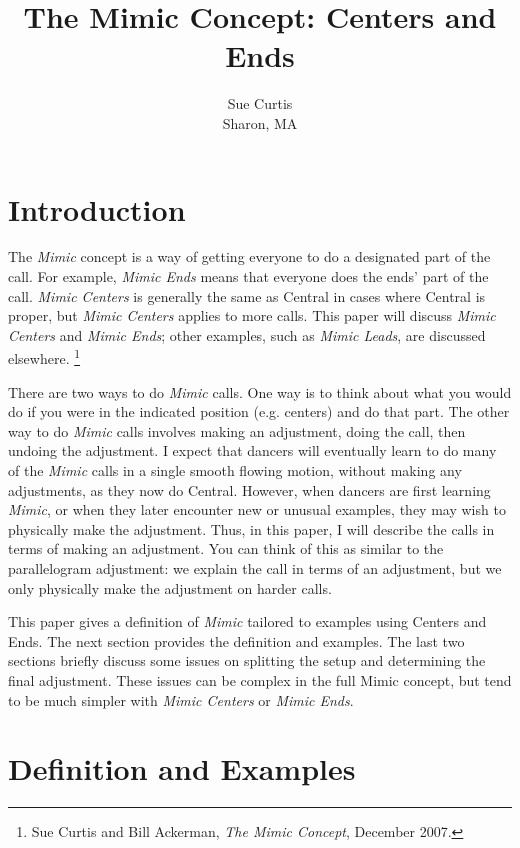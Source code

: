 \documentclass[12pt]{article}
\begin{document}
\title{The Mimic Concept: Centers and Ends}
\author{Sue Curtis \\ Sharon, MA}
\date{}
\maketitle

\parskip 12pt
\section{Introduction}

The \emph{Mimic} concept is a way of getting everyone to do a designated
part of the call.
For example, \emph{Mimic Ends} means that everyone does the ends'
part of the call.
\emph{Mimic Centers} is generally the same as Central in cases where
Central is proper, but \emph{Mimic Centers} applies to more calls.
This paper will discuss \emph{Mimic Centers} and \emph{Mimic Ends};
other examples, such as \emph{Mimic Leads}, are discussed elsewhere.
\footnote{Sue Curtis and Bill Ackerman, \emph{The Mimic Concept}, December 2007.}

There are two ways to do \emph{Mimic} calls.  One way is to think about
what you would do if you were in the indicated position
(e.g. centers) and do that part.
The other way to do \emph{Mimic} calls involves making
an adjustment, doing the call, then undoing the adjustment.   
I expect that dancers will eventually learn to do many of the
\emph{Mimic} calls in a single smooth flowing motion, without
making any adjustments, as they now do Central.
However, when dancers are first learning \emph{Mimic}, or when they
later encounter new or unusual examples, they may wish to physically
make the adjustment.  Thus, in this paper, I will describe the
calls in terms of making an adjustment.
You can think of this as similar to the parallelogram adjustment:
we explain the call in terms of an adjustment, but we only physically
make the adjustment on harder calls.

This paper gives a definition of \emph{Mimic} tailored to examples
using Centers and Ends.  The next section provides the definition and
examples.  The last two sections briefly discuss some issues on splitting
the setup and determining the final adjustment.  These issues can
be complex in the full Mimic concept, but tend to be much simpler with
\emph{Mimic Centers} or \emph{Mimic Ends}.

\section{Definition and Examples}
\end{document}
